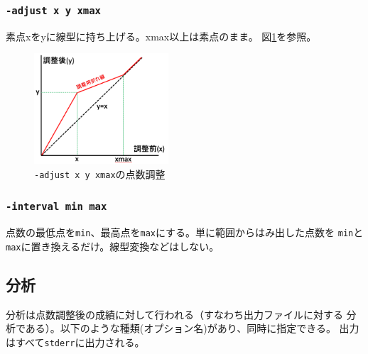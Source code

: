 \subsubsection{\texttt{-adjust x y xmax}}
\label{-adjustxyxmax}

素点xをyに線型に持ち上げる。xmax以上は素点のまま。
図\ref{fig:adjust}を参照。

\begin{figure}[htbp]
\centering
\includegraphics[keepaspectratio,width=5cm,height=0.75\textheight]{fig/adjust.png}
\caption{\texttt{-adjust x y xmax}の点数調整}
\label{fig:adjust}
\end{figure}

\subsubsection{\texttt{-interval min max}}
\label{-intervalminmax}

点数の最低点を\texttt{min}、最高点を\texttt{max}にする。単に範囲からはみ出した点数を
\texttt{min}と\texttt{max}に置き換えるだけ。線型変換などはしない。

\subsection{分析}
\label{分析}

分析は点数調整後の成績に対して行われる（すなわち出力ファイルに対する
分析である）。以下のような種類(オプション名)があり、同時に指定できる。
出力はすべて\texttt{stderr}に出力される。

